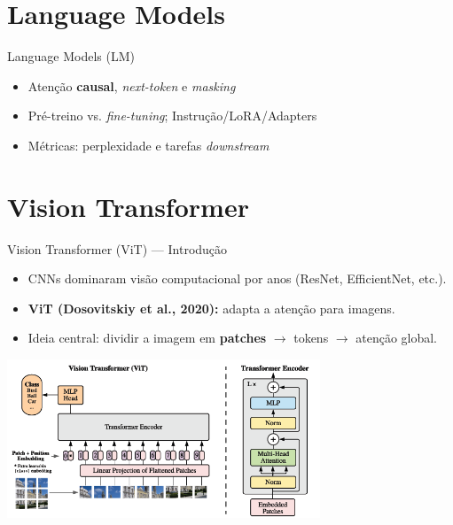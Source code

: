 \documentclass{beamer}
\begin{document}
\section{Language Models}
\begin{frame}{Language Models (LM)}
	\begin{itemize}[<+->]
		\item Atenção \textbf{causal}, \textit{next-token} e \textit{masking}
		\item Pré-treino vs. \textit{fine-tuning}; Instrução/LoRA/Adapters
		\item Métricas: perplexidade e tarefas \textit{downstream}
	\end{itemize}
\end{frame}

\section{Vision Transformer}
\begin{frame}{Vision Transformer (ViT) — Introdução}
	\begin{itemize}
		\item CNNs dominaram visão computacional por anos (ResNet, EfficientNet, etc.).
		\item \textbf{ViT (Dosovitskiy et al., 2020):} adapta a atenção para imagens.
		\item Ideia central: dividir a imagem em \textbf{patches} $\rightarrow$ tokens $\rightarrow$ atenção global.
	\end{itemize}
\vspace{0.3cm}
	\begin{center}
		\includegraphics[width=0.7\textwidth]{assets/vit_pipeline.png} %
	\end{center}
\end{frame}
\end{document}
